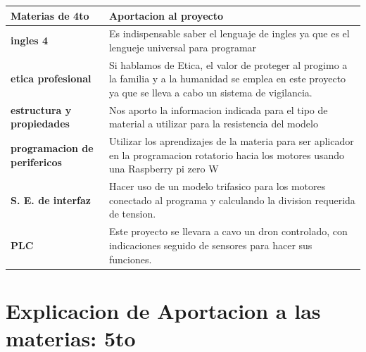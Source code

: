 \documentclass[11pt,a4paper]{article}
\begin{document}
\begin{tabular}{|p{5.5cm}|p{7cm}|}
\hline 
\textbf{Materias de 4to} & \textbf{Aportacion al proyecto} \\ \hline
\textbf{ingles 4} & Es indispensable saber el lenguaje de  ingles ya que es el lengueje universal para programar \\ \hline
\textbf{etica profesional} & Si hablamos de Etica, el valor de proteger al progimo a la familia y a la humanidad  se emplea en este proyecto ya que se lleva a cabo un sistema de vigilancia. \\ \hline
\textbf{estructura y propiedades} & Nos aporto la informacion indicada para el tipo de material a utilizar para la resistencia  del modelo \\ \hline
\textbf{programacion de perifericos} & Utilizar los aprendizajes de la materia para ser aplicador en la programacion rotatorio hacia los motores usando una Raspberry pi zero W \\ \hline
\textbf{S. E. de interfaz} & Hacer uso de un modelo trifasico para los motores conectado al programa y calculando la division requerida de tension.  \\ \hline
\textbf{PLC} & Este proyecto se llevara a cavo un dron controlado, con indicaciones seguido de sensores para hacer sus funciones. \\ \hline
\end{tabular}

\newpage

\section{Explicacion de Aportacion a las materias: 5to}
\end{document}
